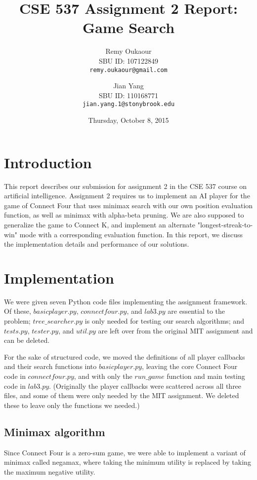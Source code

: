 \documentclass[11pt]{article}
\title{CSE 537 Assignment 2 Report: Game Search}
\author{
Remy Oukaour \\
	{\small SBU ID: 107122849}\\
	{\small \texttt{remy.oukaour@gmail.com}}
\and
Jian Yang \\
	{\small SBU ID: 110168771}\\
	{\small \texttt{jian.yang.1@stonybrook.edu}}
}
\date{Thursday, October 8, 2015}
\begin{document}
\maketitle

\section{Introduction}

This report describes our submission for assignment 2 in the CSE 537 course on
artificial intelligence. Assignment 2 requires us to implement an AI player
for the game of Connect Four that uses minimax search with our own position
evaluation function, as well as minimax with alpha-beta pruning. We are also
supposed to generalize the game to Connect K, and implement an alternate
"longest-streak-to-win" mode with a corresponding evaluation function.
In this report, we discuss the implementation details and performance of
our solutions.

\section{Implementation}

We were given seven Python code files implementing the assignment framework.
Of these, \(basicplayer.py\), \(connectfour.py\), and \(lab3.py\) are essential
to the problem; \(tree\_searcher.py\) is only needed for testing our search
algorithms; and \(tests.py\), \(tester.py\), and \(util.py\) are left over
from the original MIT assignment and can be deleted.

For the sake of structured code, we moved the definitions of all player
callbacks and their search functions into \(basicplayer.py\), leaving the core
Connect Four code in \(connectfour.py\), and with only the \(run\_game\)
function and main testing code in \(lab3.py\). (Originally the player callbacks
were scattered across all three files, and some of them were only needed by
the MIT assignment. We deleted these to leave only the functions we needed.)

\subsection{Minimax algorithm}

Since Connect Four is a zero-sum game, we were able to implement a variant of
minimax called negamax, where taking the minimum utility is replaced by
taking the maximum negative utility.
\end{document}
